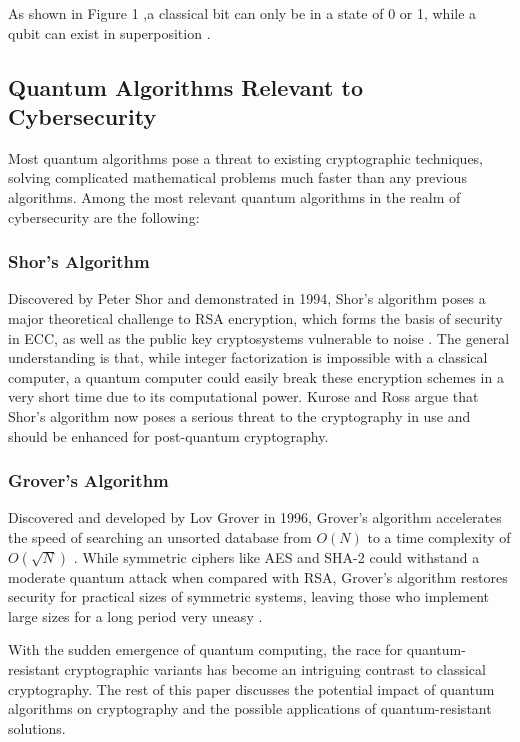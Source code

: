 \documentclass[conference]{IEEEtran}
\begin{document}
As shown in Figure 1 ,a classical bit can only be in a state of 0 or 1, while a qubit can exist in superposition \cite{unknown}.
    

\subsection{Quantum Algorithms Relevant to Cybersecurity}

Most quantum algorithms pose a threat to existing cryptographic techniques, solving complicated mathematical problems much faster than any previous algorithms. Among the most relevant quantum algorithms in the realm of cybersecurity are the following:

\subsubsection{Shor’s Algorithm}

Discovered by Peter Shor and demonstrated in 1994, Shor's algorithm poses a major theoretical challenge to RSA encryption, which forms the basis of security in ECC, as well as the public key cryptosystems vulnerable to noise \cite{Shor1994}. The general understanding is that, while integer factorization is impossible with a classical computer, a quantum computer could easily break these encryption schemes in a very short time due to its computational power. Kurose and Ross \cite{Kurose2021} argue that Shor's algorithm now poses a serious threat to the cryptography in use and should be enhanced for post-quantum cryptography.


\subsubsection{Grover’s Algorithm}

Discovered and developed by Lov Grover in 1996, Grover's algorithm accelerates the speed of searching an unsorted database from $O(N)$ to a time complexity of $O(\sqrt{N})$ \cite{Grover1996}. While symmetric ciphers like AES and SHA-2 could withstand a moderate quantum attack when compared with RSA, Grover's algorithm restores security for practical sizes of symmetric systems, leaving those who implement large sizes for a long period very uneasy \cite{Bernstein2009}.

With the sudden emergence of quantum computing, the race for quantum-resistant cryptographic variants has become an intriguing contrast to classical cryptography. The rest of this paper discusses the potential impact of quantum algorithms on cryptography and the possible applications of quantum-resistant solutions.
\end{document}
